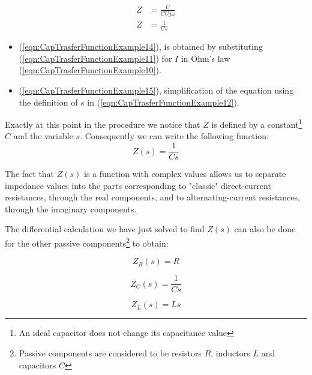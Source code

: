 \documentclass[a4paper, 10pt, final]{article} %
\begin{document}
    \begin{align}
        Z &= \frac{U}{C U j \omega} \label{eqn:CapTrasferFunctionExample14} \\
        Z &= \frac{1}{C s} \label{eqn:CapTrasferFunctionExample15}
    \end{align}
    \begin{itemize}
        \item (\ref{eqn:CapTrasferFunctionExample14}), is obtained by substituting (\ref{eqn:CapTrasferFunctionExample11}) for $I$ in Ohm's law (\ref{eqn:CapTrasferFunctionExample10}).
        \item (\ref{eqn:CapTrasferFunctionExample15}), simplification of the equation using the definition of $s$ in (\ref{eqn:CapTrasferFunctionExample12}).
    \end{itemize}
    \noindent Exactly at this point in the procedure we notice that $Z$ is defined by a constant\footnote{An ideal capacitor does not change its capacitance value} $C$ and the variable $s$.
    Consequently we can write the following function:
    \begin{equation} \label{eqn:CapTrasferFunctionExample16}
        Z(s) = \frac{1}{C s}
    \end{equation}

    \noindent The fact that $Z(s)$ is a function with complex values allows us to separate impedance values into the parts corresponding to "classic" direct-current resistances, through the real components, and to alternating-current resistances, through the imaginary components.

    The differential calculation we have just solved to find $Z(s)$ can also be done for the other passive components\footnote{Passive components are considered to be resistors $R$, inductors $L$ and capacitors $C$} to obtain:
    \begin{figure}[H]
        \centering
        \begin{minipage}[b]{.3\linewidth}
            \centering
            \begin{equation*}
                Z_R(s)=R
            \end{equation*}
        \end{minipage}
        \hspace{0.04\linewidth}
        \begin{minipage}[b]{.3\linewidth}
            \centering
            \begin{equation*}
                Z_C(s) = \frac{1}{C s}
            \end{equation*}
        \end{minipage}
        \hspace*{0.04\linewidth}
        \begin{minipage}[b]{.3\linewidth}
            \centering
            \begin{equation*}
                Z_L(s) = {L s}
            \end{equation*}
        \end{minipage}
    \end{figure}
    
\end{document}
